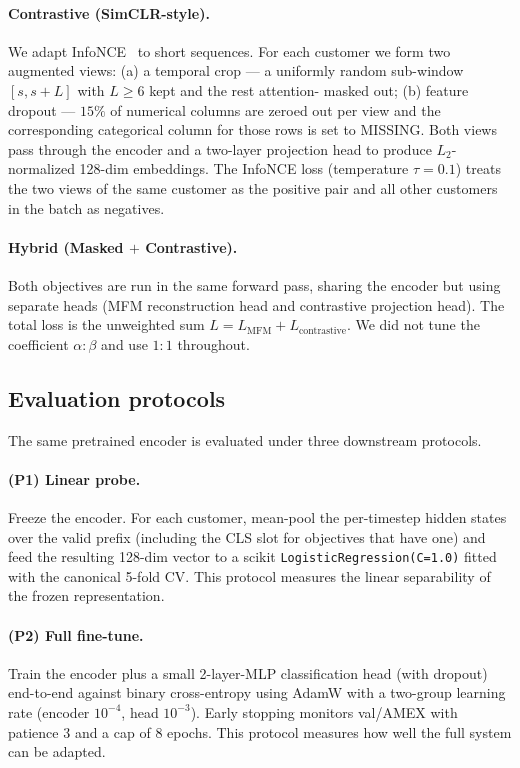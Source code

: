 \documentclass[sigconf, anonymous, review]{acmart}
\begin{document}
\paragraph{Contrastive (SimCLR-style).}
We adapt InfoNCE~\cite{Chen2020} to short sequences. For each customer
we form two augmented views: (a) a temporal crop --- a uniformly random
sub-window $[s, s+L]$ with $L \geq 6$ kept and the rest attention-
masked out; (b) feature dropout --- $15\%$ of numerical columns are
zeroed out per view and the corresponding categorical column for
those rows is set to MISSING. Both views pass through the encoder and
a two-layer projection head to produce $L_2$-normalized 128-dim
embeddings. The InfoNCE loss (temperature $\tau = 0.1$) treats the
two views of the same customer as the positive pair and all other
customers in the batch as negatives.

\paragraph{Hybrid (Masked $+$ Contrastive).}
Both objectives are run in the same forward pass, sharing the encoder
but using separate heads (MFM reconstruction head and contrastive
projection head). The total loss is the unweighted sum
$L = L_{\text{MFM}} + L_{\text{contrastive}}$. We did not tune
the coefficient $\alpha\!:\!\beta$ and use $1\!:\!1$ throughout.

\subsection{Evaluation protocols}
\label{sec:protocols}

The same pretrained encoder is evaluated under three downstream
protocols.

\paragraph{(P1) Linear probe.}
Freeze the encoder. For each customer, mean-pool the per-timestep
hidden states over the valid prefix (including the CLS slot for
objectives that have one) and feed the resulting 128-dim vector to a
scikit \texttt{LogisticRegression(C=1.0)} fitted with the canonical
5-fold CV. This protocol measures the linear separability of the
frozen representation.

\paragraph{(P2) Full fine-tune.}
Train the encoder plus a small 2-layer-MLP classification head (with
dropout) end-to-end against binary cross-entropy using AdamW with a
two-group learning rate (encoder $10^{-4}$, head $10^{-3}$). Early
stopping monitors val/AMEX with patience $3$ and a cap of $8$ epochs.
This protocol measures how well the full system can be adapted.
\end{document}
